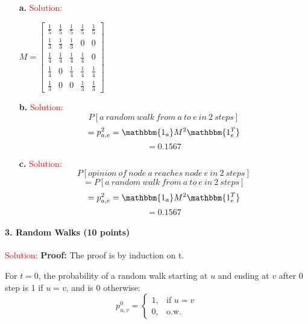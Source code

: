 \documentclass[11pt]{article} %
\begin{document}
\begin{itemize}
\item[\textbf{a. }]  
\textcolor{red}{Solution:}
 
$M=\left[ \begin{array}{ccccc}
\frac{1}{5} & \frac{1}{5} & \frac{1}{5} & \frac{1}{5} & \frac{1}{5} \\
\frac{1}{3} & \frac{1}{3} & \frac{1}{3} & 0  & 0 \\
\frac{1}{4} & \frac{1}{4} & \frac{1}{4} & \frac{1}{4} & 0 \\
\frac{1}{4} & 0 & \frac{1}{4} & \frac{1}{4} & \frac{1}{4} \\
\frac{1}{3} &  0  & 0 & \frac{1}{3} & \frac{1}{3} \end{array} \right]$


\item[\textbf{b. }]  
\textcolor{red}{Solution:}
$$P[a \ random \ walk \ from \ a \ to \ e \ in \ 2 \ steps]$$
$$=p_{a,e}^2=\mathbbm{1_a}  M^2 \mathbbm{1_e^T} $$
$$=0.1567$$

\item[\textbf{c. }]   
\textcolor{red}{Solution:}
$$P[opinion \ of \ node \ a \ reaches \ node \ e \ in \ 2 \ steps]$$
$$=P[a \ random \ walk \ from \ a \ to \ e \ in \ 2 \ steps]$$
$$=p_{a,e}^2=\mathbbm{1_a}  M^2 \mathbbm{1_e^T}$$
$$=0.1567$$

\end{itemize}






















\paragraph{3. Random Walks (10 points)} 
 \textcolor{red}{Solution:}
\textbf{Proof:} The proof is by induction on t. 
 
For $t=0$, the probability of a random walk starting at $u$ and ending at $v$ after 0 step is 1 if $u=v$, and is 0 otherwise: 
$$ p_{u,v}^0= \begin{cases} 
1, &\mbox{if } u=v \\
 0, & \mbox{o.w.} \end{cases}$$
 
\end{document}
